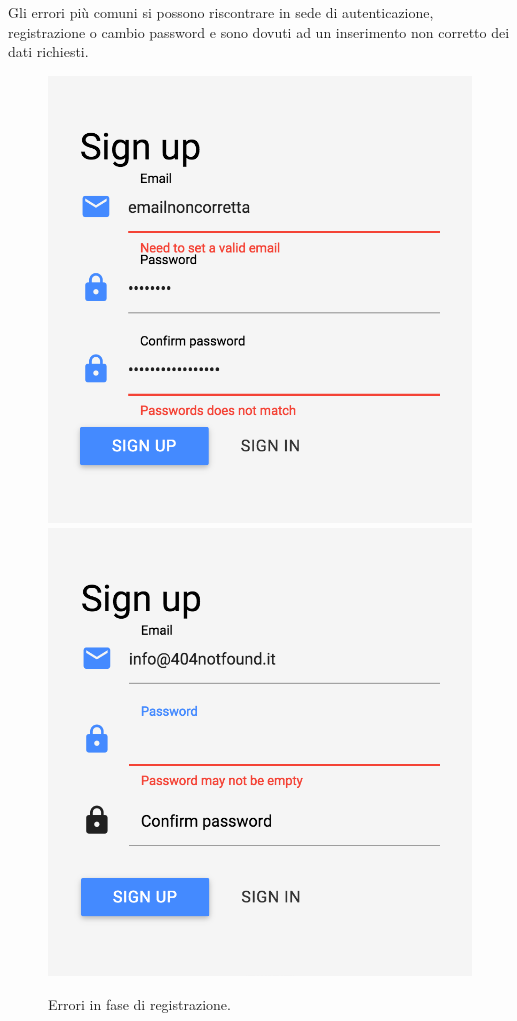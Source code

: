 Gli errori più comuni si possono riscontrare in sede di autenticazione, registrazione o cambio password e sono dovuti ad un inserimento non corretto dei dati richiesti.

\begin{figure}[!h]
\begin{center}
\includegraphics[scale=0.4]{img/signup_error.png}%
\qquad\qquad
\includegraphics[scale=0.4]{img/signup_error2.png}
\caption{Errori in fase di registrazione.}
\end{center}
\end{figure}

